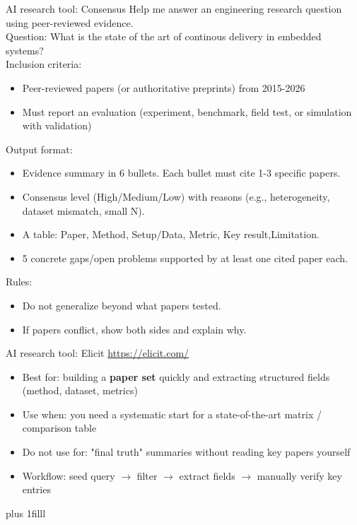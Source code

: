\documentclass[aspectratio=169]{beamer}
\newcommand{\btVFill}{\vskip0pt plus 1filll}
\begin{document}
\begin{frame}{AI research tool: Consensus}
Help me answer an engineering research question using peer-reviewed evidence. \\
Question: What is the state of the art of continous delivery in embedded systems?\\
Inclusion criteria:
\begin{itemize}
  \item Peer-reviewed papers (or authoritative preprints) from 2015-2026
  \item Must report an evaluation (experiment, benchmark, field test, or simulation with validation)
\end{itemize}

Output format:
\begin{itemize}
  \item Evidence summary in 6 bullets. Each bullet must cite 1-3 specific papers.
  \item Consensus level (High/Medium/Low) with reasons (e.g., heterogeneity, dataset mismatch, small N).
  \item A table: Paper, Method, Setup/Data, Metric, Key result,Limitation.
\item 5 concrete gaps/open problems supported by at least one cited paper each.
\end{itemize}
Rules:
\begin{itemize}
\item Do not generalize beyond what papers tested.
\item If papers conflict, show both sides and explain why.
\end{itemize}\end{frame}

\begin{frame}{AI research tool: Elicit}
  \url{https://elicit.com/}
\begin{itemize}
  \item Best for: building a \textbf{paper set} quickly and extracting structured fields (method, dataset, metrics)
  \item Use when: you need a systematic start for a state-of-the-art matrix / comparison table
  \item Do not use for: "final truth" summaries without reading key papers yourself
  \item Workflow: seed query $\rightarrow$ filter $\rightarrow$ extract fields $\rightarrow$ manually verify key entries
\end{itemize}
\btVFill\end{frame}
\end{document}
